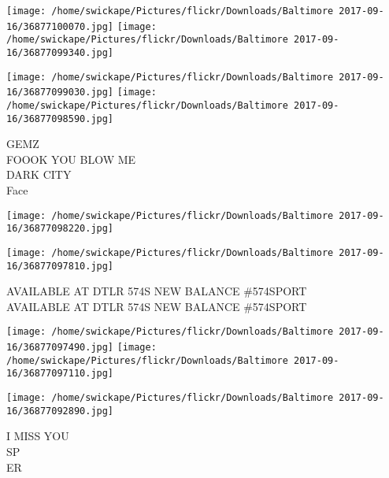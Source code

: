 \documentclass[10pt,letterpaper]{article}
\begin{document}
\texttt{[image: /home/swickape/Pictures/flickr/Downloads/Baltimore 2017-09-16/36877100070.jpg]}
\texttt{[image: /home/swickape/Pictures/flickr/Downloads/Baltimore 2017-09-16/36877099340.jpg]}

\texttt{[image: /home/swickape/Pictures/flickr/Downloads/Baltimore 2017-09-16/36877099030.jpg]}
\texttt{[image: /home/swickape/Pictures/flickr/Downloads/Baltimore 2017-09-16/36877098590.jpg]}

GEMZ\\
FOOOK YOU BLOW ME\\
DARK CITY\\
Face
\pagebreak

\texttt{[image: /home/swickape/Pictures/flickr/Downloads/Baltimore 2017-09-16/36877098220.jpg]}

\vspace{0.25in}
\texttt{[image: /home/swickape/Pictures/flickr/Downloads/Baltimore 2017-09-16/36877097810.jpg]}

AVAILABLE AT DTLR 574S NEW BALANCE \#574SPORT\\
AVAILABLE AT DTLR 574S NEW BALANCE \#574SPORT
\pagebreak

\texttt{[image: /home/swickape/Pictures/flickr/Downloads/Baltimore 2017-09-16/36877097490.jpg]}
\texttt{[image: /home/swickape/Pictures/flickr/Downloads/Baltimore 2017-09-16/36877097110.jpg]}

\texttt{[image: /home/swickape/Pictures/flickr/Downloads/Baltimore 2017-09-16/36877092890.jpg]}

I MISS YOU\\
SP\\
ER
\pagebreak
\end{document}
